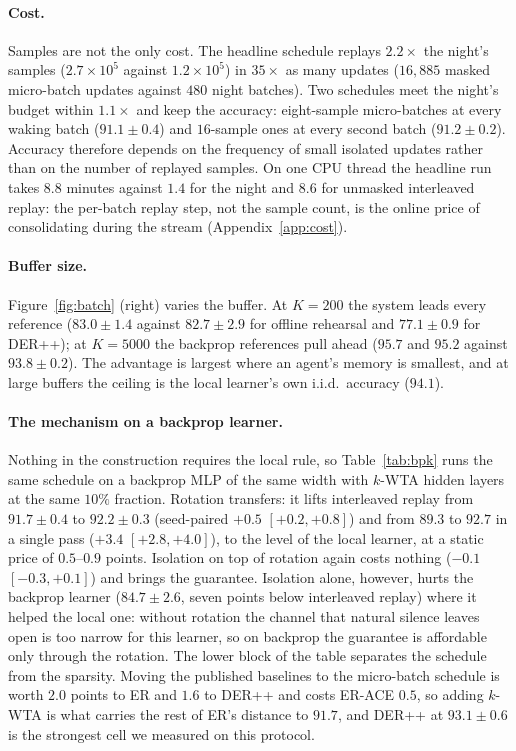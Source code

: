 \documentclass{article}
\newcommand{\kwta}{$k$-WTA}
\begin{document}
\paragraph{Cost.} Samples are not the only cost. The headline schedule replays
$2.2\times$ the night's samples ($2.7\times10^5$ against $1.2\times10^5$) in $35\times$ as
many updates ($16{,}885$ masked micro-batch updates against $480$ night batches). Two
schedules meet the night's budget within $1.1\times$ and keep the accuracy: eight-sample
micro-batches at every waking batch ($91.1\pm0.4$) and $16$-sample ones at every second
batch ($91.2\pm0.2$). Accuracy therefore depends on the frequency of small isolated updates
rather than on the number of replayed samples. On one CPU thread the headline run takes
$8.8$ minutes against $1.4$ for the night and $8.6$ for unmasked interleaved replay: the
per-batch replay step, not the sample count, is the online price of consolidating during the
stream (Appendix~\ref{app:cost}).

\paragraph{Buffer size.} Figure~\ref{fig:batch} (right) varies the buffer. At $K{=}200$ the
system leads every reference ($83.0\pm1.4$ against $82.7\pm2.9$ for offline rehearsal and
$77.1\pm0.9$ for DER++); at $K{=}5000$ the backprop references pull ahead ($95.7$ and $95.2$
against $93.8\pm0.2$). The advantage is largest where an agent's memory is smallest, and at
large buffers the ceiling is the local learner's own i.i.d.\ accuracy ($94.1$).

\paragraph{The mechanism on a backprop learner.} Nothing in the construction requires the
local rule, so Table~\ref{tab:bpk} runs the same schedule on a backprop MLP of the same width
with \kwta{} hidden layers at the same $10\%$ fraction. Rotation transfers: it lifts
interleaved replay from $91.7\pm0.4$ to $92.2\pm0.3$ (seed-paired $+0.5$ $[+0.2,+0.8]$) and
from $89.3$ to $92.7$ in a single pass ($+3.4$ $[+2.8,+4.0]$), to the level of the local
learner, at a static price of $0.5$--$0.9$ points. Isolation on top of rotation
again costs nothing ($-0.1$ $[-0.3,+0.1]$) and brings the guarantee. Isolation alone,
however, hurts the backprop learner ($84.7\pm2.6$, seven points below interleaved replay)
where it helped the local one: without rotation the channel that natural silence leaves open
is too narrow for this learner, so on backprop the guarantee is affordable only through the
rotation. The lower block of the table separates the schedule from the sparsity. Moving the
published baselines to the micro-batch schedule is worth $2.0$ points to ER and $1.6$ to
DER++ and costs ER-ACE $0.5$, so adding \kwta{} is what carries the rest of ER's distance to
$91.7$, and DER++ at $93.1\pm0.6$ is the strongest cell we measured on this protocol.
\end{document}
